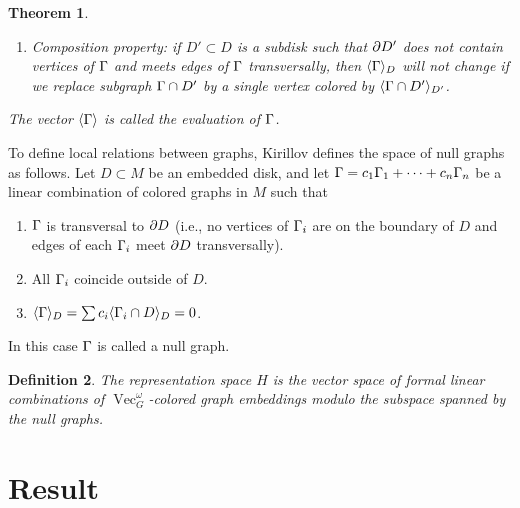 \documentclass{amsart}
\newtheorem{thm}{Theorem}[section]
\newtheorem{prop}[thm]{Proposition}
\newtheorem{defn}[thm]{Definition}
\DeclareMathOperator{\MCG}{MCG}
\DeclareMathOperator{\Vect}{Vec}
\DeclareMathOperator{\Homeo}{Homeo}
\begin{document}
\begin{thm}
\begin{enumerate}
    \item Composition property: if $D'\subset D$ is a subdisk such
      that $\partial D'$ does not contain vertices of $\Gamma$ and meets edges of
      $\Gamma$ transversally, then   $\langle\Gamma\rangle_D$ will not change if we replace
      subgraph $\Gamma\cap D'$ by a single vertex colored by
      $\langle\Gamma\cap D'\rangle_{D'}$.

  \end{enumerate}
The vector $\langle\Gamma\rangle$ is called the {\em evaluation} of $\Gamma$.
\end{thm}

To define local relations between graphs, Kirillov defines the space of
null graphs as follows.  Let $D\subset M$ be an embedded disk, and let
$\Gamma=c_1\Gamma_1+\dots+c_n\Gamma_n$ be a linear
combination of colored graphs in $M$ such that
\begin{enumerate}
  \item $\Gamma$ is transversal to $\partial D$ (i.e., no vertices of $\Gamma_i$ 
      are on the boundary of $D$ and edges of each $\Gamma_i$ meet 
      $\partial D$ transversally).
  \item All $\Gamma_i$ coincide outside of $D$.
  \item $\langle\Gamma\rangle_D=\sum c_i\langle\Gamma_i\cap D\rangle_D=0$.
\end{enumerate}
In this case $\Gamma$ is called a null graph. 

\begin{defn}
The representation space $H$ is the vector space of formal linear combinations of $\Vect_G^\omega$-colored graph embeddings modulo the subspace spanned by the null graphs.
\end{defn}

\section{Result}

\end{document}
